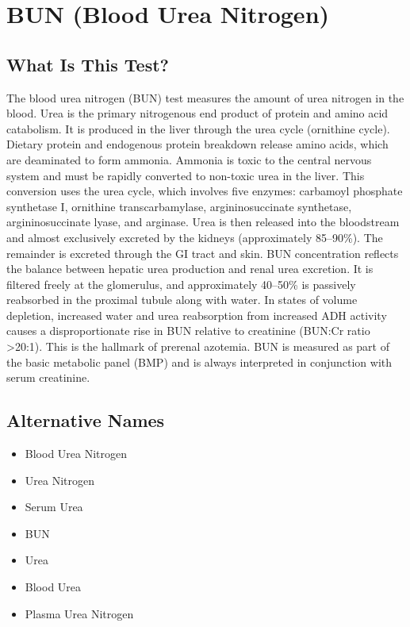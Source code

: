 \chapter{BUN (Blood Urea Nitrogen)}

\section*{What Is This Test?}
The blood urea nitrogen (BUN) test measures the amount of urea nitrogen in the blood. Urea is the primary nitrogenous end product of protein and amino acid catabolism. It is produced in the liver through the urea cycle (ornithine cycle). Dietary protein and endogenous protein breakdown release amino acids, which are deaminated to form ammonia. Ammonia is toxic to the central nervous system and must be rapidly converted to non-toxic urea in the liver. This conversion uses the urea cycle, which involves five enzymes: carbamoyl phosphate synthetase I, ornithine transcarbamylase, argininosuccinate synthetase, argininosuccinate lyase, and arginase. Urea is then released into the bloodstream and almost exclusively excreted by the kidneys (approximately 85--90\%). The remainder is excreted through the GI tract and skin. BUN concentration reflects the balance between hepatic urea production and renal urea excretion. It is filtered freely at the glomerulus, and approximately 40--50\% is passively reabsorbed in the proximal tubule along with water. In states of volume depletion, increased water and urea reabsorption from increased ADH activity causes a disproportionate rise in BUN relative to creatinine (BUN:Cr ratio >20:1). This is the hallmark of prerenal azotemia. BUN is measured as part of the basic metabolic panel (BMP) and is always interpreted in conjunction with serum creatinine.

\section*{Alternative Names}
\begin{itemize}
  \item Blood Urea Nitrogen
  \item Urea Nitrogen
  \item Serum Urea
  \item BUN
  \item Urea
  \item Blood Urea
  \item Plasma Urea Nitrogen
\end{itemize}
